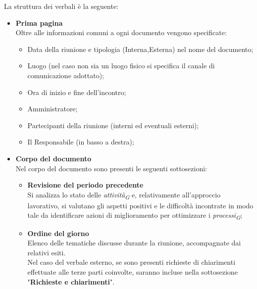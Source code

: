 La struttura dei verbali è la seguente:
\begin{itemize}
    \item \textbf{Prima pagina} \\
        Oltre alle informazioni comuni a ogni documento vengono specificate:
        \begin{itemize}
            \item Data della riunione e tipologia (Interna,Esterna) nel nome del documento;
            \item Luogo (nel caso non sia un luogo fisico si specifica il canale di comunicazione adottato);
            \item Ora di inizio e fine dell'incontro;
            \item Amministratore;
            \item Partecipanti della riunione (interni ed eventuali esterni);
            \item Il Responsabile (in basso a destra);
        \end{itemize}
    \item \textbf{Corpo del documento} \\
        Nel corpo del documento sono presenti le seguenti sottosezioni:
        \begin{itemize}
            \item \textbf{Revisione del periodo precedente} \\
            Si analizza lo stato delle \textit{attività}\textsubscript{\textit{G}} e, relativamente all'approccio lavorativo, si valutano gli aspetti positivi e le difficoltà incontrate in modo tale da identificare azioni di miglioramento per ottimizzare i \textit{processi}\textsubscript{\textit{G}};
            \item \textbf{Ordine del giorno} \\
            Elenco delle tematiche discusse durante la riunione, accompagnate dai relativi esiti. \\
            Nel caso del verbale esterno, se sono presenti richieste di chiarimenti effettuate alle terze parti coinvolte, saranno incluse nella sottosezione "\textbf{Richieste e chiarimenti}".
        

\end{itemize}
\end{itemize}
